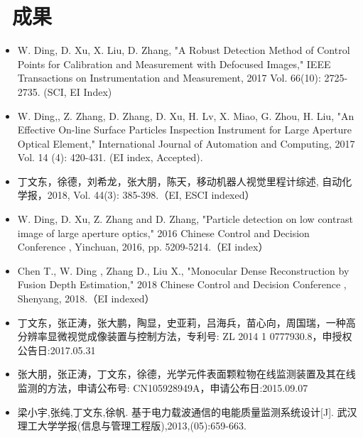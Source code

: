\documentclass{resume}
\begin{document}
\section{\faCogs\ 成果}
\begin{itemize}\small
  \item {\color{red}W. Ding}, D. Xu, X. Liu, D. Zhang, "A Robust Detection Method of Control Points for Calibration and Measurement with Defocused Images," IEEE Transactions on Instrumentation and Measurement, 2017 Vol. 66(10): 2725-2735. (SCI, EI Index)
  \item {\color{red}W. Ding},, Z. Zhang, D. Zhang, D. Xu, H. Lv, X. Miao, G. Zhou, H. Liu, "An Effective On-line Surface Particles Inspection Instrument for Large Aperture Optical Element," International Journal of Automation and Computing, 	2017 Vol. 14 (4): 420-431. (EI index, Accepted).
  \item {\color{red}丁文东}，徐德，刘希龙，张大朋，陈天，移动机器人视觉里程计综述, 自动化学报，2018, Vol. 44(3): 385-398.（EI, ESCI indexed） 
  \item {\color{red}W. Ding}, D. Xu, Z. Zhang and D. Zhang, "Particle detection on low contrast image of large aperture optics," 2016 Chinese Control and Decision Conference , Yinchuan, 2016, pp. 5209-5214.（EI index）
  \item Chen T., {\color{red}W. Ding }, Zhang D., Liu X., "Monocular Dense Reconstruction by Fusion Depth Estimation," 2018 Chinese Control and Decision Conference , Shenyang, 2018.（EI indexed）
      
  \item {\color{red}丁文东}，张正涛，张大鹏，陶显，史亚莉，吕海兵，苗心向，周国瑞，一种高分辨率显微视觉成像装置与控制方法，专利号: ZL 2014 1 0777930.8，申授权公告日:2017.05.31
  \item 张大朋，张正涛，{\color{red}丁文东}，徐德，光学元件表面颗粒物在线监测装置及其在线监测的方法，申请公布号: CN105928949A，申请公布日:2015.09.07
  \item 梁小宇,张纯,{\color{red}丁文东},徐帆. 基于电力载波通信的电能质量监测系统设计[J]. 武汉理工大学学报(信息与管理工程版),2013,(05):659-663.
\end{itemize}
\end{document}
